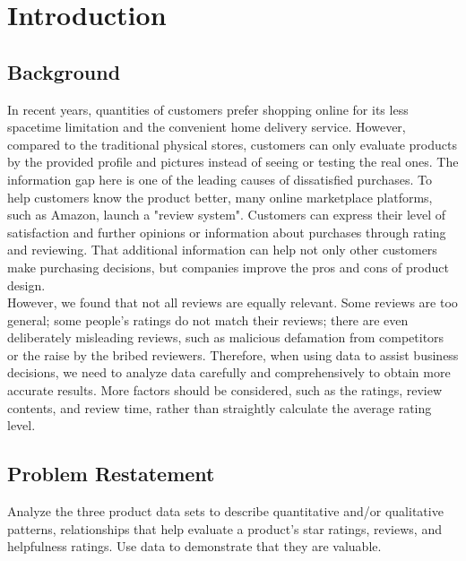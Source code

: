 \documentclass{mcmthesis}
\begin{document}
\section{ Introduction }
\subsection{Background}
In recent years, quantities of customers prefer shopping online for its less spacetime limitation and the convenient home delivery service. However, compared to the traditional physical stores, customers can only evaluate products by the provided profile and pictures instead of seeing or testing the real ones. The information gap here is one of the leading causes of dissatisfied purchases. To help customers know the product better, many online marketplace platforms, such as Amazon, launch a "review system". Customers can express their level of satisfaction and further opinions or information about purchases through rating and reviewing. That additional information can help not only other customers make purchasing decisions, but companies improve the pros and cons of product design.\\

However, we found that not all reviews are equally relevant. Some reviews are too general; some people's ratings do not match their reviews; there are even deliberately misleading reviews, such as malicious defamation from competitors or the raise by the bribed reviewers. Therefore, when using data to assist business decisions, we need to analyze data carefully and comprehensively to obtain more accurate results. More factors should be considered, such as the ratings, review contents, and review time, rather than straightly calculate the average rating level.

\subsection{Problem Restatement}
Analyze the three product data sets to describe quantitative and/or qualitative patterns, relationships that help evaluate a product's star ratings, reviews, and helpfulness ratings. Use data to demonstrate that they are valuable.\\
\end{document}

